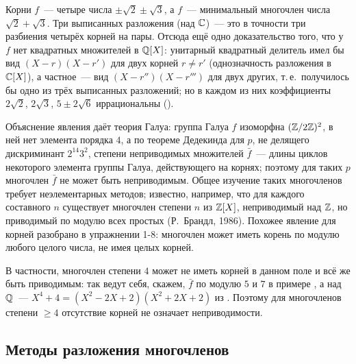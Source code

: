 Корни $f$~--- четыре числа $\pm\sqrt2\pm\sqrt3$, а $f$~--- минимальный многочлен числа $\sqrt2+\sqrt3$. Три выписанных
разложения (над $\mathbb C$)~--- это в точности три разбиения четырёх корней на пары. Отсюда ещё одно доказательство того,
что у $f$ нет квадратных множителей в $\mathbb Q[X]$: унитарный квадратный делитель имел бы вид $(X-r)(X-r')$ для двух корней
$r\ne r'$ (однозначность разложения в $\mathbb C[X]$), а частное~--- вид $(X-r'')(X-r''')$ для двух других, т.\,е.\ получилось бы
одно из трёх выписанных разложений; но в каждом из них коэффициенты $2\sqrt2$, $2\sqrt3$, $5\pm2\sqrt6$ иррациональны
().

Объяснение явления даёт
теория Галуа: группа Галуа $f$ изоморфна $(\mathbb Z/2\mathbb Z)^2$, в ней нет элемента порядка $4$, а по теореме Дедекинда 
для $p$, не делящего дискриминант $2^{14}3^2$, степени неприводимых множителей $\bar f$~--- длины циклов некоторого
элемента группы Галуа, действующего на корнях; поэтому для таких $p$ многочлен $\bar f$ не может быть неприводимым. Общее изучение таких
многочленов требует неэлементарных методов; известно, например, что для каждого составного $n$ существует многочлен
степени $n$ из $\mathbb Z[X]$, неприводимый над $\mathbb Z$, но приводимый по модулю всех простых (Р.~Брандл, 1986). Похожее явление
для корней разобрано в упражнении 1-8: многочлен может иметь корень по модулю любого целого числа, не имея целых корней.

\begin{remark}[1.18d]
В частности, многочлен степени $4$ может не иметь корней в данном поле и всё же быть приводимым: так ведут себя, скажем, $\bar f$ по модулю $5$ и $7$ в примере , а над $\mathbb Q$~---
$X^4+4=(X^2-2X+2)(X^2+2X+2)$ из . Поэтому для многочленов степени $\ge4$ отсутствие корней не означает
неприводимости.
\end{remark}

\subsection*{Методы разложения многочленов}

